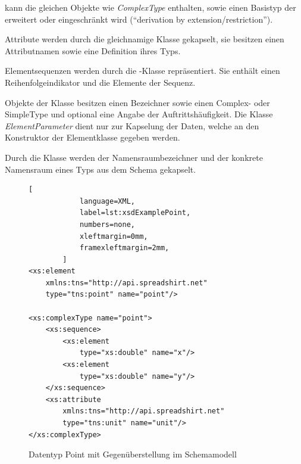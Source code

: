  kann die gleichen Objekte wie \emph{ComplexType} enthalten, sowie einen Basistyp der erweitert oder eingeschränkt wird (\enquote{derivation by extension/restriction}).

Attribute werden durch die gleichnamige Klasse  gekapselt, sie besitzen einen Attributnamen sowie eine Definition ihres Typs.

Elementsequenzen werden durch die -Klasse repräsentiert. Sie enthält einen Reihenfolgeindikator und die Elemente der Sequenz.

Objekte der Klasse  besitzen einen Bezeichner sowie einen Complex- oder SimpleType und optional eine Angabe der Auftrittshäufigkeit. Die Klasse \emph{ElementParameter} dient nur zur Kapselung der Daten, welche an den Konstruktor der Elementklasse gegeben werden.

Durch die Klasse  werden der Namensraumbezeichner und der konkrete Namensraum eines Typs aus dem Schema gekapselt. 

\begin{figure}[ht]
    \centering
    \begin{minipage}[b]{0.6\linewidth}
        \begin{lstlisting}[
            language=XML,
            label=lst:xsdExamplePoint,                
            numbers=none,
            xleftmargin=0mm,
            framexleftmargin=2mm,
        ]
<xs:element 
    xmlns:tns="http://api.spreadshirt.net" 
    type="tns:point" name="point"/>

<xs:complexType name="point">
    <xs:sequence>
        <xs:element 
            type="xs:double" name="x"/>
        <xs:element 
            type="xs:double" name="y"/>
    </xs:sequence>
    <xs:attribute 
        xmlns:tns="http://api.spreadshirt.net" 
        type="tns:unit" name="unit"/>
</xs:complexType>
        \end{lstlisting}
    \end{minipage}
    \quad    
    \begin{minipage}[b]{0.35\linewidth}
    \end{minipage}
    \caption{Datentyp Point mit Gegenüberstellung im Schemamodell}
\end{figure}